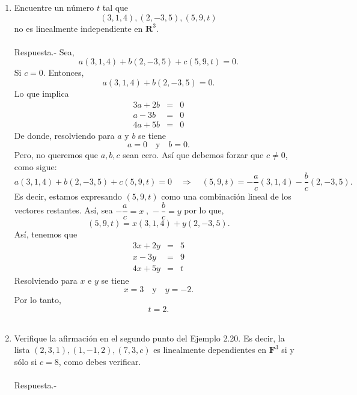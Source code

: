 \begin{enumerate}[\bfseries 1.]
\begin{enumerate}[(a)]
	\end{enumerate}


    \item Encuentre un número $t$ tal que
    $$(3,1,4),(2,-3,5),(5,9,t)$$
    no es linealmente independiente en $\textbf{R}^3$.\\\\
	Respuesta.-\; Sea,
	$$a(3,1,4)+b(2,-3,5)+c(5,9,t)=0.$$
	Si $c=0$. Entonces,
	$$a(3,1,4)+b(2,-3,5)=0.$$
	Lo que implica
	$$
	\begin{array}{rcl}
	    3a+2b&=&0\\
	    a-3b&=&0\\
	    4a+5b&=&0
	\end{array}
	$$
	De donde, resolviendo para $a$ y $b$ se tiene
	$$a=0\quad \mbox{y}\quad b=0.$$
	Pero, no queremos que $a,b,c$ sean cero. Así que debemos forzar que $c\neq 0$, como sigue:
	$$a(3,1,4)+b(2,-3,5)+c(5,9,t)=0\quad \Rightarrow \quad (5,9,t)=-\dfrac{a}{c}(3,1,4)-\dfrac{b}{c}(2,-3,5).$$
	Es decir, estamos expresando $(5,9,t)$ como una combinación lineal de los vectores restantes. Así, sea $-\dfrac{a}{c}=x\;$,$\;-\dfrac{b}{c}=y$  por lo que,
	$$(5,9,t)=x(3,1,4)+y(2,-3,5).$$
	Así, tenemos que
	$$
	\begin{array}{rcl}
	    3x+2y&=&5\\
	    x-3y&=&9\\
	    4x+5y&=&t
	\end{array}
	$$
	Resolviendo para $x$ e $y$ se tiene
	$$x=3\quad \mbox{y}\quad y=-2.$$
	Por lo tanto,
	$$t=2.$$\\

    \item Verifique la afirmación en el segundo punto del Ejemplo 2.20. Es decir, la lista $(2,3,1),(1,-1,2),(7,3,c)$ es linealmente dependientes en $\textbf{F}^3$ si y sólo si $c=8$, como debes verificar.\\\\
	Respuesta.-\;

\end{enumerate}
